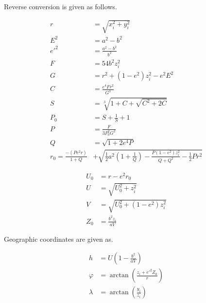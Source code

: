Reverse conversion is given as follows. \cite{Zhu1994}

\begin{align}
  r    &= \sqrt{x_i^2+y_i^2} \\
  E^2  &= a^2 - b^2 \\
  e'^2 &= \frac{a^2-b^2}{b^2} \\
  F    &= 54 b^2 z_i^2 \\
  G    &= r^2 + \left( 1 - e^2 \right) z_i^2 - e^2 E^2 \\
  C    &= \frac{e^4 F r^2}{G^3} \\
  S    &= \sqrt[3]{1+C+\sqrt{C^2+2C}} \\
  P_0  &= S + \frac{1}{S} + 1 \\
  P    &= \frac{F}{3P_0^2 G^2} \\
  Q    &= \sqrt{1 + 2e^4 P} \\
  r_0  = \frac{-\left(Pe^2 r \right)}{1+Q} &+ \sqrt{\frac{1}{2}a^2 \left(1+\frac{1}{Q}\right) - \frac{P\left(1-e^2 \right)z_i^2}{Q+Q^2}-\frac{1}{2}Pr^2}
\end{align}


\begin{align}
  U_0  &= r - e^2 r_0 \\
  U    &= \sqrt{ U_0^2 + z_i^2 } \\
  V    &= \sqrt{ U_0^2 + \left( 1 - e^2 \right) z_i^2 } \\
  Z_0  &= \frac{b^2 z_i}{aV}
\end{align}

Geographic coordinates are given as.

\begin{align}
  h    &= U \left( 1 - \frac{b^2}{aV} \right) \\
  \varphi &= \arctan \left( \frac{z_i + e'^2 Z_0}{r} \right) \\
  \lambda &= \arctan \left( \frac{y_i}{z_i} \right)
\end{align}
